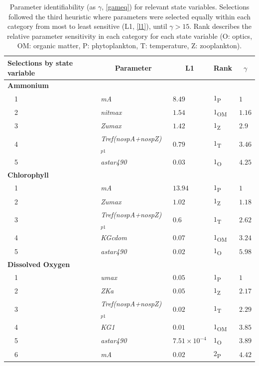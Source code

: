\documentclass[letterpaper,12pt,oneside]{article}\usepackage[]{graphicx}\usepackage[]{color}
\begin{document}
\begin{table}[!tbp]
{\scriptsize
\caption{Parameter identifiability (as $\gamma$, \cref{gameq}) for relevant state variables.  Selections followed the third heuristic where parameters were selected equally within each category from most to least sensitive (L1, \cref{l1}), until $\gamma > 15$.  Rank describes the relative parameter sensitivity in each category for each state variable (O: optics, OM: organic matter, P: phytoplankton, T: temperature, Z: zooplankton).\label{tab:heurist3}} 
\begin{center}
\begin{tabular}{lllll}
\hline\hline
\multicolumn{1}{l}{Selections by state variable}&\multicolumn{1}{c}{Parameter}&\multicolumn{1}{c}{L1}&\multicolumn{1}{c}{Rank}&\multicolumn{1}{c}{$\gamma$}\tabularnewline
\hline
{\bfseries Ammonium}&&&&\tabularnewline
~~1&\scriptsize{\textit{mA}}&$8.49$&$1$\textsubscript{P}&$1$\tabularnewline
~~2&\scriptsize{\textit{nitmax}}&$1.54$&$1$\textsubscript{OM}&$1.16$\tabularnewline
~~3&\scriptsize{\textit{Zumax}}&$1.42$&$1$\textsubscript{Z}&$2.9$\tabularnewline
~~4&\scriptsize{\textit{Tref(nospA+nospZ)$_{p1}$}}&$0.79$&$1$\textsubscript{T}&$3.46$\tabularnewline
~~5&\scriptsize{\textit{astar490}}&$0.03$&$1$\textsubscript{O}&$4.25$\tabularnewline
\hline
{\bfseries Chlorophyll}&&&&\tabularnewline
~~1&\scriptsize{\textit{mA}}&$13.94$&$1$\textsubscript{P}&$1$\tabularnewline
~~2&\scriptsize{\textit{Zumax}}&$1.02$&$1$\textsubscript{Z}&$1.18$\tabularnewline
~~3&\scriptsize{\textit{Tref(nospA+nospZ)$_{p1}$}}&$0.6$&$1$\textsubscript{T}&$2.62$\tabularnewline
~~4&\scriptsize{\textit{KGcdom}}&$0.07$&$1$\textsubscript{OM}&$3.24$\tabularnewline
~~5&\scriptsize{\textit{astar490}}&$0.02$&$1$\textsubscript{O}&$5.98$\tabularnewline
\hline
{\bfseries Dissolved Oxygen}&&&&\tabularnewline
~~1&\scriptsize{\textit{umax}}&$0.05$&$1$\textsubscript{P}&$1$\tabularnewline
~~2&\scriptsize{\textit{ZKa}}&$0.05$&$1$\textsubscript{Z}&$2.17$\tabularnewline
~~3&\scriptsize{\textit{Tref(nospA+nospZ)$_{p1}$}}&$0.02$&$1$\textsubscript{T}&$2.29$\tabularnewline
~~4&\scriptsize{\textit{KG1}}&$0.01$&$1$\textsubscript{OM}&$3.85$\tabularnewline
~~5&\scriptsize{\textit{astar490}}&$7.51\times 10^{-4}$&$1$\textsubscript{O}&$3.89$\tabularnewline
~~6&\scriptsize{\textit{mA}}&$0.02$&$2$\textsubscript{P}&$4.42$\tabularnewline

\end{tabular}
\end{center}}
\end{table}
\end{document}
